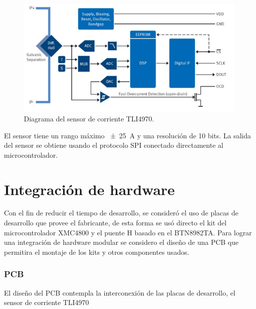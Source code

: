\begin{figure}[H]
  \centering
  \includegraphics[scale=.45]{img/cap3/tli4970}
  \caption{Diagrama del sensor de corriente TLI4970.}
  \label{cap3_tli4970}
\end{figure}

El sensor tiene un rango máximo \SI{\pm 25}{\ampere} y una resolución de 10 bits. La salida del sensor se obtiene usando el protocolo SPI conectado directamente al microcontrolador.

\section{Integración de hardware}

Con el fin de reducir el tiempo de desarrollo, se consideró el uso de placas de desarrollo que provee el fabricante, de esta forma se usó directo el kit del microcontrolador XMC4800 y el puente H basado en el BTN8982TA. Para lograr una integración de hardware modular se considero el diseño de una PCB que permitira el montaje de los kits y otros componentes usados.

\subsubsection{PCB}

El diseño del PCB contempla la interconexión de las placas de desarrollo, el sensor de corriente TLI4970 



